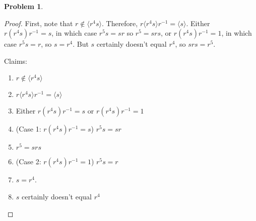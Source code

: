 \documentclass[12pt]{article}
\theoremstyle{definition} %
\newtheorem{problem}{Problem}
\newcommand\inv{^{-1}} %
\def\<{\langle}
\def\>{\rangle}
\begin{document}
\begin{problem}
\begin{enumerate}[(a)]
        \begin{proof}
            First, note that $r\not\in \<r^4s\>$. Therefore, $r\<r^4s\>r\inv = \<s\>$. Either $r(r^4s)r\inv = s$, in which case $r^5s = sr$ so $r^5 = srs$, or $r(r^4s)r\inv = 1$, in which case $r^5s = r$, so $s = r^4$. But $s$ certainly doesn't equal $r^4$, so $srs = r^5$.

            Claims:
            \begin{enumerate}[(1)]
                \item $r\not\in \<r^4s\>$
                \item $r\<r^4s\>r\inv = \<s\>$
                \item Either $r(r^4s)r\inv = s$ or $r(r^4s)r\inv = 1$
                \item (Case 1: $r(r^4s)r\inv = s$)  $r^5s = sr$ 
                \item $r^5 = srs$
                \item (Case 2: $r(r^4s)r\inv = 1$) $r^5s = r$
                \item $s = r^4$. 
                \item $s$ certainly doesn't equal $r^4$
            \end{enumerate}
        \end{proof}
    \end{enumerate}
\end{problem}

\pagebreak
\end{document}
